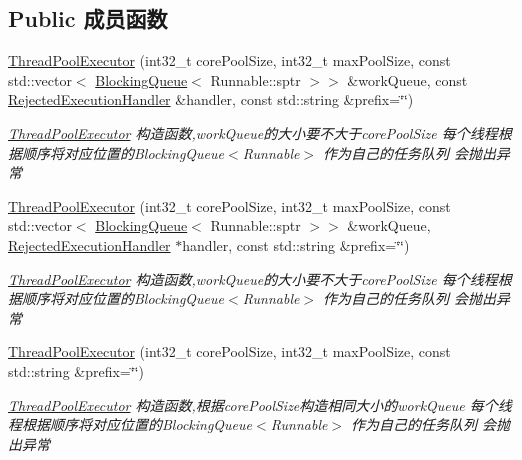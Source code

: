 \subsection*{Public 成员函数}
\begin{DoxyCompactItemize}
\item 
\hyperlink{classThreadPoolExecutor_a212b34b7e25e9eba4e096473a1b81f9e}{Thread\+Pool\+Executor} (int32\+\_\+t core\+Pool\+Size, int32\+\_\+t max\+Pool\+Size, const std\+::vector$<$ \hyperlink{classBlockingQueue}{Blocking\+Queue}$<$ Runnable\+::sptr $>$$>$ \&work\+Queue, const \hyperlink{classRejectedExecutionHandler}{Rejected\+Execution\+Handler} \&handler, const std\+::string \&prefix=\char`\"{}\char`\"{})
\begin{DoxyCompactList}\small\item\em \hyperlink{classThreadPoolExecutor}{Thread\+Pool\+Executor} 构造函数,work\+Queue的大小要不大于core\+Pool\+Size 每个线程根据顺序将对应位置的\+Blocking\+Queue$<$\+Runnable$>$ 作为自己的任务队列 会抛出异常 \end{DoxyCompactList}\item 
\hyperlink{classThreadPoolExecutor_ab750236e7b95489a1cb66d4b026717fc}{Thread\+Pool\+Executor} (int32\+\_\+t core\+Pool\+Size, int32\+\_\+t max\+Pool\+Size, const std\+::vector$<$ \hyperlink{classBlockingQueue}{Blocking\+Queue}$<$ Runnable\+::sptr $>$$>$ \&work\+Queue, \hyperlink{classRejectedExecutionHandler}{Rejected\+Execution\+Handler} $\ast$handler, const std\+::string \&prefix=\char`\"{}\char`\"{})
\begin{DoxyCompactList}\small\item\em \hyperlink{classThreadPoolExecutor}{Thread\+Pool\+Executor} 构造函数,work\+Queue的大小要不大于core\+Pool\+Size 每个线程根据顺序将对应位置的\+Blocking\+Queue$<$\+Runnable$>$ 作为自己的任务队列 会抛出异常 \end{DoxyCompactList}\item 
\hyperlink{classThreadPoolExecutor_a071bcc9eb42b365e2ce28a32938d422e}{Thread\+Pool\+Executor} (int32\+\_\+t core\+Pool\+Size, int32\+\_\+t max\+Pool\+Size, const std\+::string \&prefix=\char`\"{}\char`\"{})
\begin{DoxyCompactList}\small\item\em \hyperlink{classThreadPoolExecutor}{Thread\+Pool\+Executor} 构造函数,根据core\+Pool\+Size构造相同大小的work\+Queue 每个线程根据顺序将对应位置的\+Blocking\+Queue$<$\+Runnable$>$ 作为自己的任务队列 会抛出异常 \end{DoxyCompactList}\item 

\end{DoxyCompactItemize}
